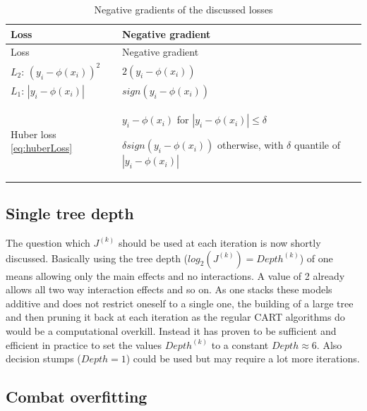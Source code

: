 \documentclass[
]{book}
\begin{document}
\begin{longtable}[]{@{}
  >{\raggedright\arraybackslash}p{}
  >{\raggedright\arraybackslash}p{}@{}}
\caption{\label{tab:lossGradients} Negative gradients of the discussed losses \citep{elements}}\tabularnewline
\toprule
Loss & Negative gradient \\
\midrule
\endfirsthead
\toprule
Loss & Negative gradient \\
\midrule
\endhead
\(L_2\): \((y_i - \phi(x_i))^2\) & \(2(y_i - \phi(x_i))\) \\
\(L_1\): \(|y_i - \phi(x_i)|\) & \(sign(y_i - \phi(x_i))\) \\
Huber loss \eqref{eq:huberLoss} & \(y_i - \phi(x_i)\) for \(|y_i - \phi(x_i)| \leq \delta\)

\(\delta sign(y_i - \phi(x_i))\) otherwise, with \(\delta\) quantile of \(|y_i - \phi(x_i)|\) \\
\bottomrule
\end{longtable}

\hypertarget{single-tree-depth}{%
\subsection{Single tree depth}\label{single-tree-depth}}

The question which \(J^{(k)}\) should be used at each iteration is now shortly discussed. Basically using the tree depth (\(log_2(J^{(k)}) = Depth^{(k)}\)) of one means allowing only the main effects and no interactions. A value of 2 already allows all two way interaction effects and so on. As one stacks these models additive and does not restrict oneself to a single one, the building of a large tree and then pruning it back at each iteration as the regular CART algorithms do would be a computational overkill. Instead it has proven to be sufficient and efficient in practice to set the values \(Depth^{(k)}\) to a constant \(Depth \approx 6\).\citep{elements} Also decision stumps (\(Depth = 1\)) could be used but may require a lot more iterations.

\hypertarget{combOver}{%
\subsection{Combat overfitting}\label{combOver}}
\end{document}
